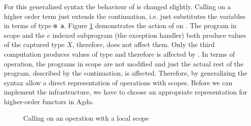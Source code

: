 For this generalized syntax the behaviour of \AgdaFunction{>>=} is changed
slightly.
Calling \AgdaFunction{>>=} on a higher order term just extends the continuation,
i.e. just substitutes the variables in terms of type \texttt{m a}.
Figure \ref{higher-order:syntax:bind} demonstrates the action of
\AgdaFunction{>>=} on .
The program in scope and the $e$ indexed subprogram (the exception handler) both
produce values of the captured type $X$, therefore, \AgdaFunction{>>=} does not
affect them.
Only the third computation produces values of type  and
therefore is affected by \AgdaFunction{>>=}.
In terms of operation, the programs in scope are not modified and just the
actual rest of the program, described by the continuation, is affected.
Therefore, by generalizing the syntax \textcite{DBLP:conf/haskell/WuSH14} allow
a direct representation of operations with scopes.
Before we can implement the infrastructure, we have to choose an appropriate
representation for higher-order functors in Agda.

\begin{figure}
  \begin{center}
  \end{center}
  \caption{Calling \bind{} on an operation with a local scope}
  \label{higher-order:syntax:bind}
\end{figure}


